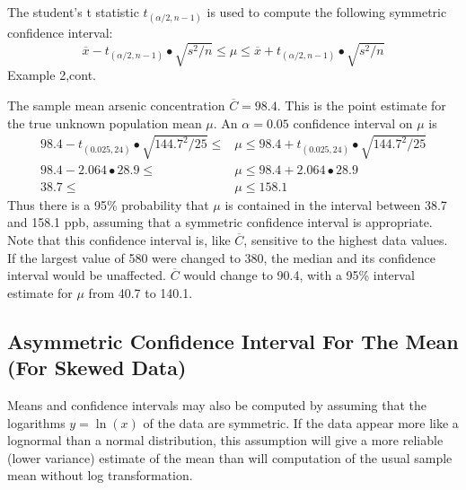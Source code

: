 \documentclass[]{book}
\begin{document}
The student's t statistic \(t_{(\alpha / 2, n − 1)}\) is used to compute the following symmetric confidence interval:
\begin{equation}
\overline{x} - t_{(\alpha / 2, n - 1)} \bullet \sqrt{s^{2} / n} \leq \mu \leq \overline{x} + t_{(\alpha / 2, n - 1)} \bullet \sqrt{s^{2} / n}
\label{eq:3-8}
\end{equation}
Example 2,cont.

The sample mean arsenic concentration \(\overline{C} = 98.4\). This is the point estimate for the true unknown population mean \(\mu\). An \(\alpha = 0.05\) confidence interval on \(\mu\) is
\begin{equation}
\begin{aligned}
98.4 - t_{(0.025, 24)} \bullet \sqrt{144.7^{2} / 25} \leq &\mu \leq 98.4 + t_{(0.025, 24)} \bullet \sqrt{144.7^{2} / 25} \\
98.4 - 2.064 \bullet 28.9 \leq &\mu \leq 98.4 + 2.064 \bullet 28.9 \\
38.7 \leq &\mu \leq 158.1
\end{aligned}
\end{equation}
Thus there is a 95\% probability that \(\mu\) is contained in the interval between 38.7 and 158.1 ppb, assuming that a symmetric confidence interval is appropriate. Note that this confidence interval is, like \(\overline{C}\), sensitive to the highest data values. If the largest value of 580 were changed to 380, the median and its confidence interval would be unaffected. \(\overline{C}\) would change to 90.4, with a 95\% interval estimate for \(\mu\) from 40.7 to 140.1.

\hypertarget{ch3-4-2}{%
\subsection{Asymmetric Confidence Interval For The Mean (For Skewed Data)}\label{ch3-4-2}}

Means and confidence intervals may also be computed by assuming that the logarithms \(y = \ln{(x)}\) of the data are symmetric. If the data appear more like a lognormal than a normal distribution, this assumption will give a more reliable (lower variance) estimate of the mean than will computation of the usual sample mean without log transformation.
\end{document}
